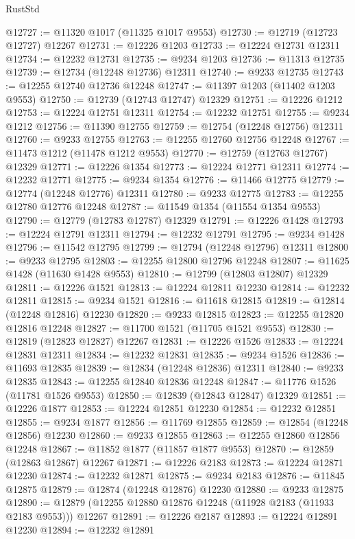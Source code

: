 \begin{lexlean}{RustStd}
\begin{coremodule}
@12727 := @11320 @1017 (@11325 @1017 @9553)
@12730 := @12719 (@12723 @12727) @12267
@12731 := @12226 @1203
@12733 := @12224 @12731 @12311
@12734 := @12232 @12731
@12735 := @9234 @1203
@12736 := @11313 @12735
@12739 := @12734 (@12248 @12736) @12311
@12740 := @9233 @12735
@12743 := @12255 @12740 @12736 @12248
@12747 := @11397 @1203 (@11402 @1203 @9553)
@12750 := @12739 (@12743 @12747) @12329
@12751 := @12226 @1212
@12753 := @12224 @12751 @12311
@12754 := @12232 @12751
@12755 := @9234 @1212
@12756 := @11390 @12755
@12759 := @12754 (@12248 @12756) @12311
@12760 := @9233 @12755
@12763 := @12255 @12760 @12756 @12248
@12767 := @11473 @1212 (@11478 @1212 @9553)
@12770 := @12759 (@12763 @12767) @12329
@12771 := @12226 @1354
@12773 := @12224 @12771 @12311
@12774 := @12232 @12771
@12775 := @9234 @1354
@12776 := @11466 @12775
@12779 := @12774 (@12248 @12776) @12311
@12780 := @9233 @12775
@12783 := @12255 @12780 @12776 @12248
@12787 := @11549 @1354 (@11554 @1354 @9553)
@12790 := @12779 (@12783 @12787) @12329
@12791 := @12226 @1428
@12793 := @12224 @12791 @12311
@12794 := @12232 @12791
@12795 := @9234 @1428
@12796 := @11542 @12795
@12799 := @12794 (@12248 @12796) @12311
@12800 := @9233 @12795
@12803 := @12255 @12800 @12796 @12248
@12807 := @11625 @1428 (@11630 @1428 @9553)
@12810 := @12799 (@12803 @12807) @12329
@12811 := @12226 @1521
@12813 := @12224 @12811 @12230
@12814 := @12232 @12811
@12815 := @9234 @1521
@12816 := @11618 @12815
@12819 := @12814 (@12248 @12816) @12230
@12820 := @9233 @12815
@12823 := @12255 @12820 @12816 @12248
@12827 := @11700 @1521 (@11705 @1521 @9553)
@12830 := @12819 (@12823 @12827) @12267
@12831 := @12226 @1526
@12833 := @12224 @12831 @12311
@12834 := @12232 @12831
@12835 := @9234 @1526
@12836 := @11693 @12835
@12839 := @12834 (@12248 @12836) @12311
@12840 := @9233 @12835
@12843 := @12255 @12840 @12836 @12248
@12847 := @11776 @1526 (@11781 @1526 @9553)
@12850 := @12839 (@12843 @12847) @12329
@12851 := @12226 @1877
@12853 := @12224 @12851 @12230
@12854 := @12232 @12851
@12855 := @9234 @1877
@12856 := @11769 @12855
@12859 := @12854 (@12248 @12856) @12230
@12860 := @9233 @12855
@12863 := @12255 @12860 @12856 @12248
@12867 := @11852 @1877 (@11857 @1877 @9553)
@12870 := @12859 (@12863 @12867) @12267
@12871 := @12226 @2183
@12873 := @12224 @12871 @12230
@12874 := @12232 @12871
@12875 := @9234 @2183
@12876 := @11845 @12875
@12879 := @12874 (@12248 @12876) @12230
@12880 := @9233 @12875
@12890 := @12879 (@12255 @12880 @12876 @12248 (@11928 @2183 (@11933 @2183 @9553))) @12267
@12891 := @12226 @2187
@12893 := @12224 @12891 @12230
@12894 := @12232 @12891

\end{coremodule}
\end{lexlean}
